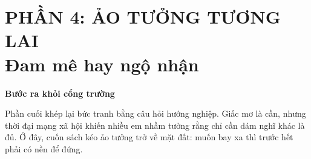 \documentclass[14pt,a4paper,twoside]{extbook}
\newcommand{\partintro}[2]{%
  \begin{center}
    \begin{minipage}{0.86\textwidth}
    \begin{tcolorbox}[
      colback=bookbg,
      colframe=booksecondary,
      boxrule=0.8pt,
      arc=4pt,
      enhanced,
      left=8pt,right=8pt,top=8pt,bottom=8pt
    ]
    {\centering\bfseries\color{bookprimary}#1\par}
    \vspace{5pt}
    {\small #2}
    \end{tcolorbox}
    \end{minipage}
  \end{center}
  \vspace{8pt}
}
\begin{document}
\part*{PHẦN 4: ẢO TƯỞNG TƯƠNG LAI\\\large Đam mê hay ngộ nhận}
\partintro{Bước ra khỏi cổng trường}{Phần cuối khép lại bức tranh bằng câu hỏi hướng nghiệp. Giấc mơ là cần, nhưng thời đại mạng xã hội khiến nhiều em nhầm tưởng rằng chỉ cần dám nghĩ khác là đủ. Ở đây, cuốn sách kéo ảo tưởng trở về mặt đất: muốn bay xa thì trước hết phải có nền để đứng.}





\backmatter






\end{document}
